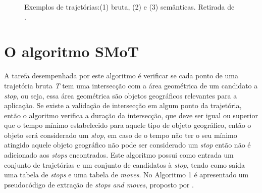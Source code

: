 \documentclass[	12pt, Times, openright, twoside, a4paper, english, brazil]{abntex2}
\begin{document}
\begin{figure}[!ht]
\caption{Exemplos de trajetórias:(1) bruta, (2) e (3) semânticas. Retirada de \cite{Bogorny2012}.\label{fig:figura}}
\end{figure}

\section{O algoritmo SMoT}
A tarefa desempenhada por este algoritmo é verificar se cada ponto de uma trajetória bruta \textit{T} tem uma intersecção com a área geométrica de um candidato a \textit{stop}, ou seja, essa área geométrica são objetos geográficos relevantes para a aplicação. Se existe a validação de intersecção em algum ponto da trajetória, então o algoritmo verifica a duração da intersecção, que deve ser igual ou superior que o tempo mínimo estabelecido para aquele tipo de objeto geográfico, então o objeto será considerado um \textit{stop}, em caso de o tempo não ter o seu mínimo atingido aquele objeto geográfico não pode ser considerado um \textit{stop} então não é adicionado aos \textit{stops} encontrados. Este algoritmo possui como entrada um conjunto de trajetórias e um conjunto de candidatos à \textit{stop}, tendo como saída uma tabela de \textit{stops} e uma tabela de \textit{moves}.
No Algoritmo 1 é apresentado um pseudocódigo de extração de \textit{stops and moves}, proposto por \cite{alvares2007}. \\
\end{document}
